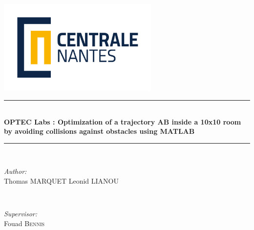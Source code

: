 \begin{titlepage}

\newcommand{\HRule}{\rule{\linewidth}{0.5mm}} %

\center %
 

\includegraphics[width=0.6\textwidth]{ecn.png}


\HRule \\[0.4cm]
{ \huge \bfseries OPTEC Labs : Optimization of a trajectory AB inside a 10x10 room by avoiding collisions against obstacles using MATLAB}\\[0.4cm] %
\HRule \\[1.5cm]
 

\begin{minipage}{0.4\textwidth}
\begin{flushleft} \large
\emph{Author:}\\
Thomas \textsc{MARQUET} %
Leonid \textsc{LIANOU}
\end{flushleft}
\end{minipage}
~
\begin{minipage}{0.4\textwidth}
\begin{flushright} \large
\emph{Supervisor:} \\
Fouad \textsc{Bennis} %
\end{flushright}
\end{minipage}\\[2cm]


\end{titlepage}

